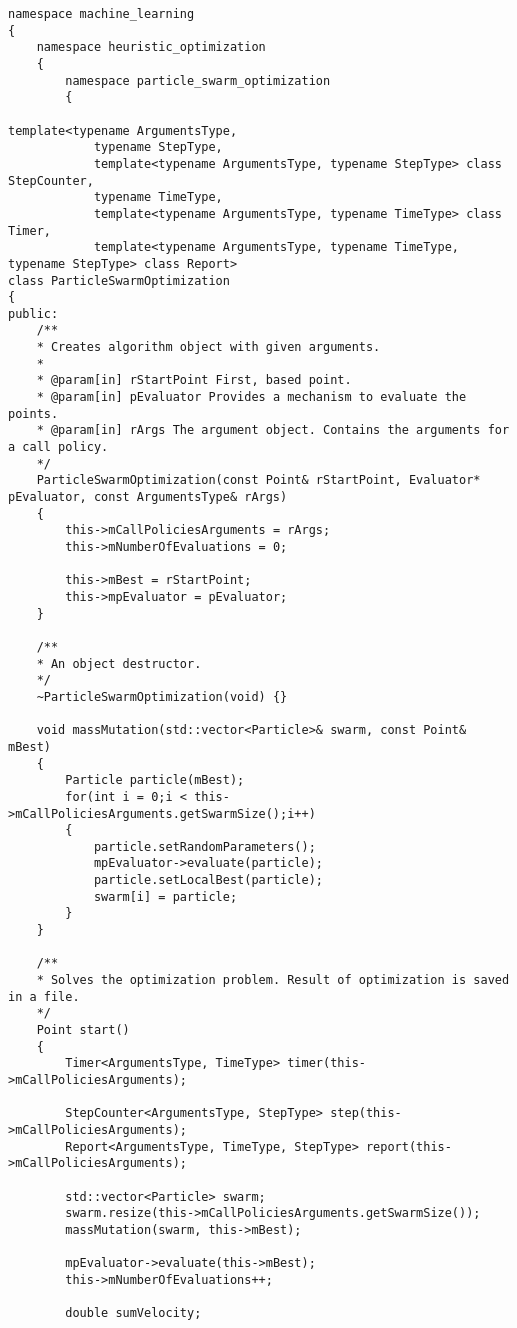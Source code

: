 \begin{lstlisting}
namespace machine_learning
{
    namespace heuristic_optimization
    {
        namespace particle_swarm_optimization
        {

template<typename ArgumentsType,
            typename StepType,
            template<typename ArgumentsType, typename StepType> class StepCounter,
            typename TimeType,
            template<typename ArgumentsType, typename TimeType> class Timer,
            template<typename ArgumentsType, typename TimeType, typename StepType> class Report>
class ParticleSwarmOptimization
{
public:
    /**
    * Creates algorithm object with given arguments.
    *
    * @param[in] rStartPoint First, based point.
    * @param[in] pEvaluator Provides a mechanism to evaluate the points.
    * @param[in] rArgs The argument object. Contains the arguments for a call policy.
    */
    ParticleSwarmOptimization(const Point& rStartPoint, Evaluator* pEvaluator, const ArgumentsType& rArgs)
    {
        this->mCallPoliciesArguments = rArgs;
        this->mNumberOfEvaluations = 0;

        this->mBest = rStartPoint;
        this->mpEvaluator = pEvaluator;
    }

    /**
    * An object destructor.
    */
    ~ParticleSwarmOptimization(void) {}

    void massMutation(std::vector<Particle>& swarm, const Point& mBest)
    {
        Particle particle(mBest);
        for(int i = 0;i < this->mCallPoliciesArguments.getSwarmSize();i++)
        {
            particle.setRandomParameters();
            mpEvaluator->evaluate(particle);
            particle.setLocalBest(particle);
            swarm[i] = particle;
        }
    }

    /**
    * Solves the optimization problem. Result of optimization is saved in a file.
    */
    Point start()
    {
        Timer<ArgumentsType, TimeType> timer(this->mCallPoliciesArguments);

        StepCounter<ArgumentsType, StepType> step(this->mCallPoliciesArguments);
        Report<ArgumentsType, TimeType, StepType> report(this->mCallPoliciesArguments);

        std::vector<Particle> swarm;
        swarm.resize(this->mCallPoliciesArguments.getSwarmSize());
        massMutation(swarm, this->mBest);

        mpEvaluator->evaluate(this->mBest);
        this->mNumberOfEvaluations++;

        double sumVelocity;


\end{lstlisting}
